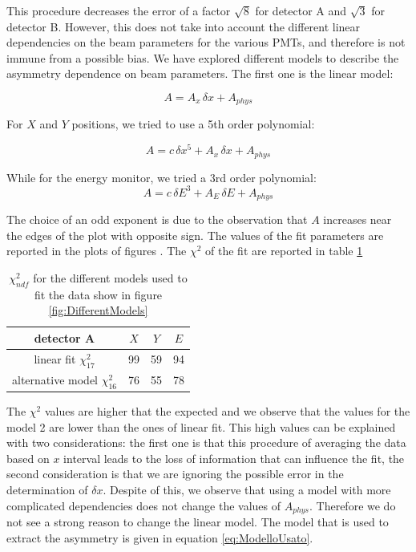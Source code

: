  This procedure decreases the error of a factor $\sqrt{8}$ for detector A and $\sqrt{3}$ for detector B. However, this does not take into account the different linear dependencies on the beam parameters for the various PMTs, and therefore is not immune from a possible bias. 
We have explored different models to describe the asymmetry dependence on beam parameters. The first one is the linear model: 

\begin{equation}
A = A_{x} \, \delta x + A_{phys}
\end{equation}

For $X$ and $Y$ positions, we tried to use a 5th order polynomial:

\begin{equation}
A = c \, \delta x^{5} + A_{x} \, \delta x + A_{phys}
\end{equation}

While for the energy monitor, we tried a 3rd order polynomial:
\begin{equation}
A = c \, \delta E^{3} + A_{E} \, \delta E + A_{phys}
\end{equation}

The choice of an odd exponent is due to the observation that $A$ increases near the edges of the plot with opposite sign.
The values of the fit parameters are reported in the plots of figures . The $\chi^{2}$ of the fit are reported in table \ref{tab:ChisqDiffModel}

\begin{table}[!ht]
\centering
\begin{tabular}{c|c|c|c}
\hline 
detector A & $X$ & $Y$ & $E$ \\
\hline 
linear fit $\chi^{2}_{17}$ & 99 & 59 & 94 \\ 
alternative model $\chi^{2}_{16}$ & 76 & 55 & 78 \\ 
\end{tabular}
\caption{$\chi^{2} _{ndf}$ for the different models used to fit the data show in figure \ref{fig:DifferentModels}}
\label{tab:ChisqDiffModel}
\end{table}

The $\chi^{2}$ values are higher that the expected and we observe that the values for the model 2 are lower than the ones of linear fit.
This high values can be explained with two considerations: the first one is that this procedure of averaging the data based on $x$ interval leads to the loss of information that can influence the fit, the second consideration is that we are ignoring the possible error in the determination of $\delta x$.
Despite of this, we observe that using a model with more complicated dependencies does not change  the values of $A_{phys}$. Therefore we do not see a strong reason to change the linear model. The model that is used to extract the asymmetry is given in equation \ref{eq:ModelloUsato}. 

